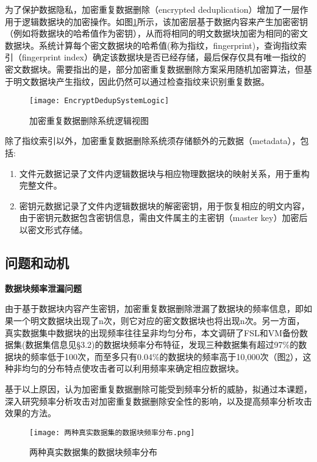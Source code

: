 为了保护数据隐私，加密重复数据删除（encrypted deduplication）增加了一层作用于逻辑数据块的加密操作。如图\ref{fig:加密重复数据删除系统逻辑视图}所示，该加密层基于数据内容来产生加密密钥（例如将数据块的哈希值作为密钥），从而将相同的明文数据块加密为相同的密文数据块。系统计算每个密文数据块的哈希值(称为指纹，fingerprint)，查询指纹索引（fingerprint index）确定该数据块是否已经存储，最后保存仅具有唯一指纹的密文数据块。需要指出的是，部分加密重复数据删除方案采用随机加密算法，但基于明文数据块产生指纹，因此仍然可以通过检查指纹来识别重复数据。

\begin{figure}[!htb]
    \small
    \centering
    \texttt{[image: EncryptDedupSystemLogic]}
    \caption{加密重复数据删除系统逻辑视图}
    \label{fig:加密重复数据删除系统逻辑视图}
\end{figure}

除了指纹索引以外，加密重复数据删除系统须存储额外的元数据（metadata），包括:
\begin{enumerate}
    \item 文件元数据记录了文件内逻辑数据块与相应物理数据块的映射关系，用于重构完整文件。
    \item 密钥元数据记录了文件内逻辑数据块的解密密钥，用于恢复相应的明文内容，由于密钥元数据包含密钥信息，需由文件属主的主密钥（master key）加密后以密文形式存储。
\end{enumerate}

\subsection{问题和动机}

\textbf{数据块频率泄漏问题}

由于基于数据块内容产生密钥，加密重复数据删除泄漏了数据块的频率信息，即如果一个明文数据块出现了n次，则它对应的密文数据块也将出现n次。另一方面，真实数据集中数据块的出现频率往往呈非均匀分布，本文调研了FSL和VM备份数据集(数据集信息见§3.2)的数据块频率分布特征，发现三种数据集有超过97\%的数据块的频率低于100次，而至多只有0.04\%的数据块的频率高于10,000次（图\ref{fig:两种真实数据集的数据块频率分布}），这种非均匀的分布特点使攻击者可以利用频率来确定相应数据块。

基于以上原因，认为加密重复数据删除可能受到频率分析的威胁，拟通过本课题，深入研究频率分析攻击对加密重复数据删除安全性的影响，以及提高频率分析攻击效果的方法。


\begin{figure}[!htb]
    \small
    \centering
    \texttt{[image: 两种真实数据集的数据块频率分布.png]} %
    \caption{两种真实数据集的数据块频率分布} 
    \label{fig:两种真实数据集的数据块频率分布}
\end{figure}

